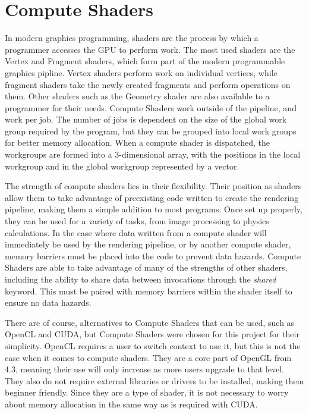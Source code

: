 \chapter{Compute Shaders}

In modern graphics programming, shaders are the process by which a programmer accesses the GPU to perform work. The most used shaders are the Vertex and Fragment shaders, which form part of the modern programmable graphics pipline. Vertex shaders perform work on individual vertices, while fragment shaders take the newly created fragments and perform operations on them. Other shaders such as the Geometry shader are also available to a programmer for their needs. Compute Shaders work outside of the pipeline, and work per job. The number of jobs  is dependent on the size of the global work group required by the program, but they can be grouped into local work groups for better memory allocation. When a compute shader is dispatched, the workgroups are formed into a 3-dimensional array, with the positions in the local workgroup and in the global workgroup represented by a vector.

The strength of compute shaders lies in their flexibility. Their position as shaders allow them to take advantage of preexisting code written to create the rendering pipeline, making them a simple addition to most programs. Once set up properly, they can be used for a variety of tasks, from image processing to physics calculations. In the case where data written from a compute shader will immediately be used by the rendering pipeline, or by another compute shader, memory barriers must be placed into the code to prevent data hazards. Compute Shaders are able to take advantage of many of the strengths of other shaders, including the ability to share data between invocations through the \textit{shared} keyword. This must be paired with memory barriers within the shader itself to ensure no data hazards.

There are of course, alternatives to Compute Shaders that can be used, such as OpenCL and CUDA, but Compute Shaders were chosen for this project for their simplicity. OpenCL requires a user to switch context to use it, but this is not the case when it comes to compute shaders. They are a core part of OpenGL from 4.3, meaning their use will only increase as more users upgrade to that level. They also do not require external libraries or drivers to be installed, making them beginner friendly. Since they are a type of shader, it is not necessary to worry about memory allocation in the same way as is required with CUDA.



